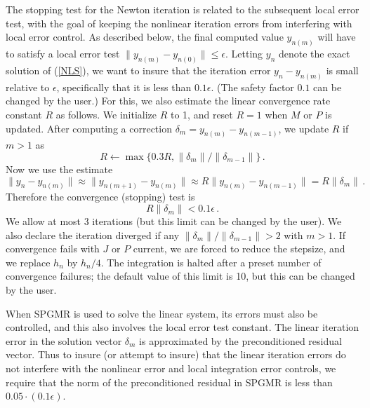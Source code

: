 The stopping test for the Newton iteration is related to the
subsequent local error test, with the goal of keeping the nonlinear
iteration errors from interfering with local error control.  As
described below, the final computed value $y_{n(m)}$ will have to
satisfy a local error test $\|y_{n(m)} - y_{n(0)}\| \leq \epsilon$.
Letting $y_n$ denote the exact solution of (\ref{NLS}), we want
to insure that the iteration error $y_n - y_{n(m)}$ is small relative
to $\epsilon$, specifically that it is less than $0.1 \epsilon$.
(The safety factor $0.1$ can be changed by the user.)  For this, we
also estimate the linear convergence rate constant $R$ as follows.
We initialize $R$ to 1, and reset $R = 1$ when $M$ or $P$ is updated.
After computing a correction $\delta_m = y_{n(m)}-y_{n(m-1)}$, we
update $R$ if $m > 1$ as
\begin{equation*}
  R \leftarrow \max\{0.3R , \|\delta_m\| / \|\delta_{m-1}\| \} \, . 
\end{equation*}
Now we use the estimate
\begin{equation*}
  \| y_n - y_{n(m)} \| \approx \| y_{n(m+1)} - y_{n(m)} \| 
  \approx R \| y_{n(m)} - y_{n(m-1)} \|  =  R \|\delta_m \| \, . 
\end{equation*}
Therefore the convergence (stopping) test is 
\begin{equation*}
  R \|\delta_m \| < 0.1 \epsilon \, .
\end{equation*}
We allow at most 3 iterations (but this limit can be changed by the
user).  We also declare the iteration diverged if any $\|\delta_m\| /
\|\delta_{m-1}\| > 2$ with $m > 1$. If convergence fails with $J$ or
$P$ current, we are forced to reduce the stepsize, and we replace
$h_n$ by $h_n/4$.  The integration is halted after a preset number
of convergence failures; the default value of this limit is 10, 
but this can be changed by the user.

When SPGMR is used to solve the linear system, its errors must also be
controlled, and this also involves the local error test constant.  The
linear iteration error in the solution vector $\delta_m$ is
approximated by the preconditioned residual vector.  Thus to insure
(or attempt to insure) that the linear iteration errors do not
interfere with the nonlinear error and local integration error
controls, we require that the norm of the preconditioned residual
in SPGMR is less than $0.05 \cdot (0.1 \epsilon)$.

